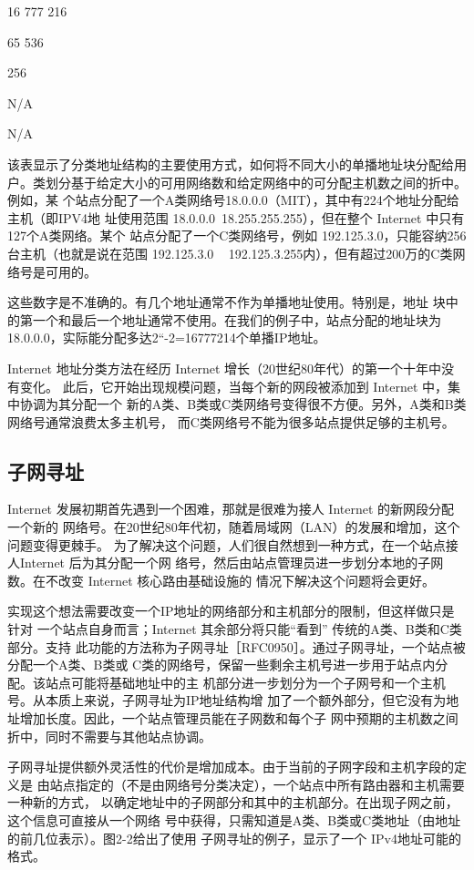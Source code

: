16 777 216

65 536

256

N/A

N/A

该表显示了分类地址结构的主要使用方式，如何将不同大小的单播地址块分配给用
户。类划分基于给定大小的可用网络数和给定网络中的可分配主机数之间的折中。例如，某
个站点分配了一个A类网络号18.0.0.0（MIT），其中有224个地址分配给主机（即IPV4地
址使用范围 18.0.0.0~18.255.255.255），但在整个 Internet 中只有127个A类网络。某个
站点分配了一个C类网络号，例如 192.125.3.0，只能容纳256台主机（也就是说在范围
192.125.3.0 ~ 192.125.3.255内），但有超过200万的C类网络号是可用的。

\begin{tcolorbox}
    这些数字是不准确的。有几个地址通常不作为单播地址使用。特别是，地址
    块中的第一个和最后一个地址通常不使用。在我们的例子中，站点分配的地址块为
    18.0.0.0，实际能分配多达2“-2=16777214个单播IP地址。
\end{tcolorbox}

Internet 地址分类方法在经历 Internet 增长（20世纪80年代）的第一个十年中没有变化。
此后，它开始出现规模问题，当每个新的网段被添加到 Internet 中，集中协调为其分配一个
新的A类、B类或C类网络号变得很不方便。另外，A类和B类网络号通常浪费太多主机号，
而C类网络号不能为很多站点提供足够的主机号。

\subsection{子网寻址}
Internet 发展初期首先遇到一个困难，那就是很难为接人 Internet 的新网段分配一个新的
网络号。在20世纪80年代初，随着局域网（LAN）的发展和增加，这个问题变得更棘手。
为了解决这个问题，人们很自然想到一种方式，在一个站点接人Internet 后为其分配一个网
络号，然后由站点管理员进一步划分本地的子网数。在不改变 Internet 核心路由基础设施的
情况下解决这个问题将会更好。

实现这个想法需要改变一个IP地址的网络部分和主机部分的限制，但这样做只是针对
一个站点自身而言；Internet 其余部分将只能“看到” 传统的A类、B类和C类部分。支持
此功能的方法称为子网寻址［RFC0950］。通过子网寻址，一个站点被分配一个A类、B类或
C类的网络号，保留一些剩余主机号进一步用于站点内分配。该站点可能将基础地址中的主
机部分进一步划分为一个子网号和一个主机号。从本质上来说，子网寻址为IP地址结构增
加了一个额外部分，但它没有为地址增加长度。因此，一个站点管理员能在子网数和每个子
网中预期的主机数之间折中，同时不需要与其他站点协调。

子网寻址提供额外灵活性的代价是增加成本。由于当前的子网字段和主机字段的定义是
由站点指定的（不是由网络号分类决定），一个站点中所有路由器和主机需要一种新的方式，
以确定地址中的子网部分和其中的主机部分。在出现子网之前，这个信息可直接从一个网络
号中获得，只需知道是A类、B类或C类地址（由地址的前几位表示）。图2-2给出了使用
子网寻址的例子，显示了一个 IPv4地址可能的格式。

